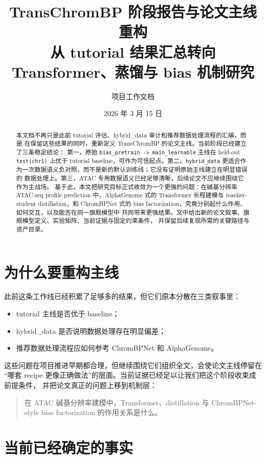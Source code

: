 \documentclass[11pt,a4paper]{ctexart}
\title{TransChromBP 阶段报告与论文主线重构\\
\large 从 tutorial 结果汇总转向 Transformer、蒸馏与 bias 机制研究}
\author{项目工作文档}
\date{2026 年 3 月 15 日}
\begin{document}
\maketitle
\onehalfspacing

\begin{abstract}
本文档不再只是此前 tutorial 评估、hybrid\_data 审计和推荐数据处理流程的汇编，而是
在保留这些结果的同时，重新定义 TransChromBP 的论文主线。当前阶段已经建立了三条稳定结论：
第一，原始 \texttt{bias\_pretrain -> main\_learnable} 主线在 held-out
\texttt{test(chr1)} 上优于 tutorial baseline，可作为可信起点。第二，\texttt{hybrid\_data}
更适合作为一次数据语义负对照，而不是新的默认训练线；它没有证明原始主线建立在明显错误的
数据处理上。第三，ATAC 专用数据语义已经足够清晰，后续论文不应继续围绕它作为主战场。
基于此，本文把研究目标正式收敛为一个更强的问题：在碱基分辨率 ATAC-seq profile prediction
中，AlphaGenome 式的 Transformer 长程建模与 teacher-student distillation，和
ChromBPNet 式的 bias factorization，究竟分别起什么作用、如何交互，以及能否在同一旗舰模型中
共同带来更强结果。文中给出新的论文叙事、旗舰模型定义、实验矩阵、当前证据与固定约束条件，
并保留后续复现所需的关键路径与资产目录。
\end{abstract}

\section{为什么要重构主线}

此前这条工作线已经积累了足够多的结果，但它们原本分散在三类叙事里：
\begin{itemize}[leftmargin=2em]
  \item tutorial 主线是否优于 baseline；
  \item hybrid\_data 是否说明数据处理存在明显偏差；
  \item 推荐数据处理流程应如何参考 ChromBPNet 和 AlphaGenome。
\end{itemize}

这些问题在项目推进早期都合理，但继续围绕它们组织全文，会使论文主线停留在
“哪套 recipe 更像正确做法”的层面。当前证据已经足以让我们把这个阶段收束成前提条件，
并把论文真正的问题上移到机制层：
\begin{quote}
在 ATAC 碱基分辨率建模中，Transformer、distillation 与 ChromBPNet-style bias
factorization 的作用关系是什么。
\end{quote}

\section{当前已经确定的事实}
\end{document}
